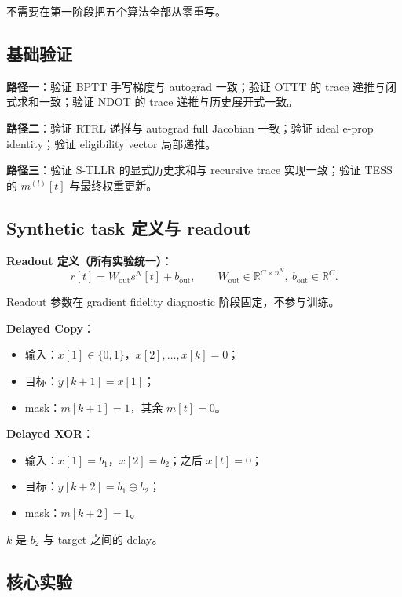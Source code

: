 \documentclass[journal,12pt,onecolumn]{IEEEtran}
\begin{document}
不需要在第一阶段把五个算法全部从零重写。

\subsection{基础验证}

\textbf{路径一}：验证 BPTT 手写梯度与 autograd 一致；验证 OTTT 的 trace 递推与闭式求和一致；验证 NDOT 的 trace 递推与历史展开式一致。

\textbf{路径二}：验证 RTRL 递推与 autograd full Jacobian 一致；验证 ideal e-prop identity；验证 eligibility vector 局部递推。

\textbf{路径三}：验证 S-TLLR 的显式历史求和与 recursive trace 实现一致；验证 TESS 的 $m^{(l)}[t]$ 与最终权重更新。

\subsection{Synthetic task 定义与 readout}

\textbf{Readout 定义（所有实验统一）}：
\begin{equation}
r[t]=W_{\mathrm{out}}s^N[t]+b_{\mathrm{out}},
\qquad
W_{\mathrm{out}}\in\mathbb R^{C\times n^N},\ b_{\mathrm{out}}\in\mathbb R^C.
\end{equation}

Readout 参数在 gradient fidelity diagnostic 阶段固定，不参与训练。

\textbf{Delayed Copy}：
\begin{itemize}[leftmargin=1.5em,itemsep=0pt]
\item 输入：$x[1]\in\{0,1\}$，$x[2],\dots,x[k]=0$；
\item 目标：$y[k+1]=x[1]$；
\item mask：$m[k+1]=1$，其余 $m[t]=0$。
\end{itemize}

\textbf{Delayed XOR}：
\begin{itemize}[leftmargin=1.5em,itemsep=0pt]
\item 输入：$x[1]=b_1$，$x[2]=b_2$；之后 $x[t]=0$；
\item 目标：$y[k+2]=b_1\oplus b_2$；
\item mask：$m[k+2]=1$。
\end{itemize}

$k$ 是 $b_2$ 与 target 之间的 delay。

\subsection{核心实验}
\end{document}
